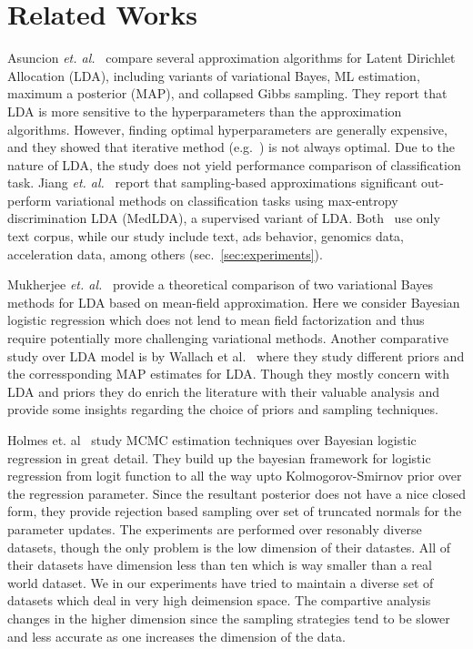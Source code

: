 \section{Related Works}

Asuncion {\it et. al.}~\cite{Asuncion2009smoothing} compare several
approximation algorithms for Latent Dirichlet Allocation (LDA), including
variants of variational Bayes, ML estimation, maximum a posterior (MAP), and
collapsed Gibbs sampling. They report that LDA is more sensitive to the
hyperparameters than the approximation algorithms. However, finding optimal
hyperparameters are generally expensive, and they showed that iterative method
(e.g.~\cite{Minka00}) is not always optimal. Due to the nature of LDA, the
study does not yield performance comparison of classification task. Jiang {\it
et. al.}~\cite{medlda_MCMC12} report that sampling-based approximations
significant out-perform variational methods on classification tasks using
max-entropy discrimination LDA (MedLDA), a supervised variant of LDA.
Both~\cite{Asuncion2009smoothing, medlda_MCMC12} use only text corpus, while
our study include text, ads behavior, genomics data, acceleration data, among
others (sec.~\ref{sec:experiments}). 

Mukherjee {\it et. al.}~\cite{Mukherjee08} provide a theoretical comparison of
two variational Bayes methods for LDA based on mean-field approximation. Here
we consider Bayesian logistic regression which does not lend to mean field
factorization and thus require potentially more challenging variational
methods. Another comparative study over LDA model is by Wallach et
al.~\cite{WallachMM09} where they study different priors and the
corressponding MAP estimates for LDA. Though they mostly concern with LDA and
priors they do enrich the literature with their valuable analysis and provide
some insights regarding the choice of priors and sampling techniques. 

Holmes et. al~\cite{Holmes} study MCMC estimation techniques over Bayesian logistic
regression in great detail. They build up the bayesian framework for logistic
regression from logit function to all the way upto Kolmogorov-Smirnov prior over
the regression parameter. Since the resultant posterior does not have a nice
closed form, they provide rejection based sampling over set of truncated
normals for the parameter updates. The experiments are performed over resonably
diverse datasets, though the only problem is the low dimension of their
datastes. All of their datasets have dimension less than ten which is way
smaller than a real world dataset. We in our experiments have tried to maintain
a diverse set of datasets which deal in very high deimension space. The
compartive analysis changes in the higher dimension since the sampling
strategies tend to be slower and less accurate as one increases the dimension of
the data. 

